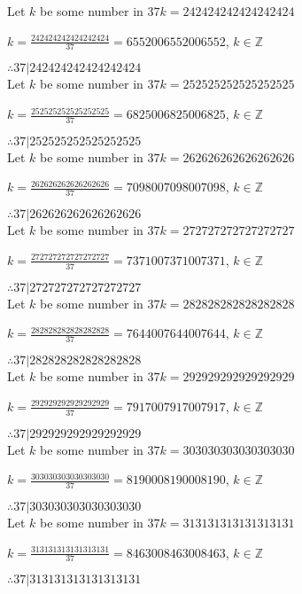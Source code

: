 \documentclass{article}
\begin{document}
Let $k$ be some number in $37k = 242424242424242424$

$k = \frac{242424242424242424}{37} = 6552006552006552$, $k \in \mathbb{Z}$

$ \therefore  37|242424242424242424 $ \\

Let $k$ be some number in $37k = 252525252525252525$

$k = \frac{252525252525252525}{37} = 6825006825006825$, $k \in \mathbb{Z}$

$ \therefore  37|252525252525252525 $ \\

Let $k$ be some number in $37k = 262626262626262626$

$k = \frac{262626262626262626}{37} = 7098007098007098$, $k \in \mathbb{Z}$

$ \therefore  37|262626262626262626 $ \\

Let $k$ be some number in $37k = 272727272727272727$

$k = \frac{272727272727272727}{37} = 7371007371007371$, $k \in \mathbb{Z}$

$ \therefore  37|272727272727272727 $ \\

Let $k$ be some number in $37k = 282828282828282828$

$k = \frac{282828282828282828}{37} = 7644007644007644$, $k \in \mathbb{Z}$

$ \therefore  37|282828282828282828 $ \\

Let $k$ be some number in $37k = 292929292929292929$

$k = \frac{292929292929292929}{37} = 7917007917007917$, $k \in \mathbb{Z}$

$ \therefore  37|292929292929292929 $ \\

Let $k$ be some number in $37k = 303030303030303030$

$k = \frac{303030303030303030}{37} = 8190008190008190$, $k \in \mathbb{Z}$

$ \therefore  37|303030303030303030 $ \\

Let $k$ be some number in $37k = 313131313131313131$

$k = \frac{313131313131313131}{37} = 8463008463008463$, $k \in \mathbb{Z}$

$ \therefore  37|313131313131313131 $ \\
\end{document}
